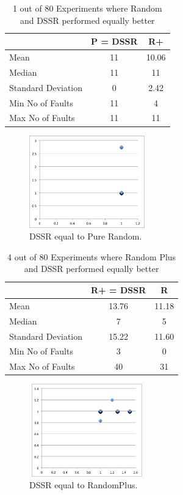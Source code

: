 \documentclass[conference]{IEEEtran}
\begin{document}
\begin{table}[H]
\caption{1 out of 80 Experiments where Random and DSSR performed equally better}
\centering
\begin{tabular}{|l|c|c|}
\hline\hline
 				& P = DSSR			&  R+ \\
\hline
Mean  			&    11				&  10.06\\
Median 			&    11 				&  11\\
Standard Deviation 	&    0					&  2.42\\
Min No of Faults	&    11				&  4\\
Max No of Faults 	&    11				&  11\\
\hline
\end{tabular}
\label{table:DSSRequaltoRandom}
\end{table}

\begin{figure}[H]
\centering
\includegraphics[width=5cm,height=4cm]{DSSRequaltoPureRandom5.png}
\caption{DSSR equal to Pure Random.}
\label{fig:DSSRequaltoRandom}
\end{figure}


\begin{table}[H]
\caption{4 out of 80 Experiments where Random Plus and DSSR performed equally better}
\centering
\begin{tabular}{|l|c|c|}
\hline\hline
 				& R+ = DSSR			&  R \\[1ex]
\hline
Mean  			&    13.76				&  11.18\\
Median 			&    7 				&  5\\
Standard Deviation 	&    15.22				&  11.60\\
Min No of Faults	&    3					&  0\\
Max No of Faults 	&    40				&  31\\
\hline
\end{tabular}
\label{table:DSSRequaltoRandomPlus}
\end{table}

\begin{figure}[ht]
\centering
\includegraphics[width=5cm,height=4cm]{DSSRequaltoRandomPlus5.png}
\caption{DSSR equal to RandomPlus.}
\label{fig:DSSRequaltoRandomPlus}
\end{figure}
\end{document}
